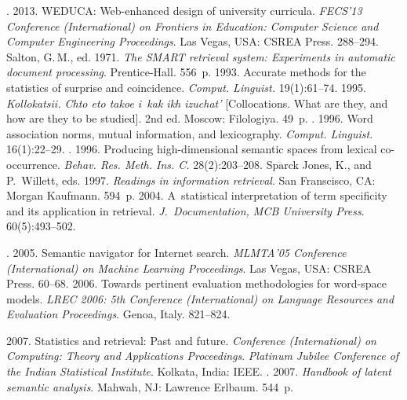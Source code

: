 \begin{multicols}{2}
{{\begin{thebibliography}{99}
. 2013. WEDUCA: Web-enhanced design of university curricula.
\textit{FECS'13 Conference (International) on Frontiers in Education: Computer
Science and Computer Engineering Proceedings}. Las Vegas, USA: CSREA
Press. 288--294.
Salton, G.\,M., ed. 1971. \textit{The SMART retrieval system: Experiments in
automatic document processing}. Prentice-Hall. 556~p.
 1993. Accurate methods for the statistics of surprise and
coincidence. \textit{Comput. Linguist.} 19(1):61--74.
 1995. \textit{Kollokatsii. Chto eto takoe i~kak ikh izuchat'}
[Collocations. What are they, and how are they to be studied]. 2nd ed. Moscow:
Filologiya. 49~p.
. 1996. Word association norms, mutual
information, and lexicography. \textit{Comput. Linguist.} 16(1):22--29.
. 1996. Producing high-dimensional semantic
spaces from lexical co-occurrence. \textit{Behav. Res. Meth.
Ins. C.} 28(2):203--208.
Sp$\ddot{\mbox{a}}$rck Jones, K., and P.~Willett, eds. 1997. \textit{Readings in
information retrieval}. San Franscisco, CA: Morgan Kaufmann. 594~p.
 2004. A~statistical interpretation of
term specificity and its application in retrieval. \textit{J.~Documentation, MCB
University Press}. 60(5):493--502.

. 2005. Semantic
navigator for Internet search. \textit{MLMTA'05 Conference (International) on
Machine Learning Proceedings}. Las Vegas, USA: CSREA Press. 60--68.
 2006. Towards pertinent evaluation methodologies for
word-space models. \textit{LREC 2006: 5th Conference (International) on
Language Resources and Evaluation Proceedings}. Genoa, Italy. 821--824.

 2007. Statistics and retrieval: Past and
future. \textit{Conference (International) on Computing: Theory and Applications
Proceedings}. \textit{Platinum Jubilee Conference of the Indian Statistical
Institute}. Kolkata, India: IEEE.
. 2007.
\textit{Handbook of latent semantic analysis}. Mahwah, NJ: Lawrence Erlbaum.
544~p.



\end{thebibliography}}}
\end{multicols}
